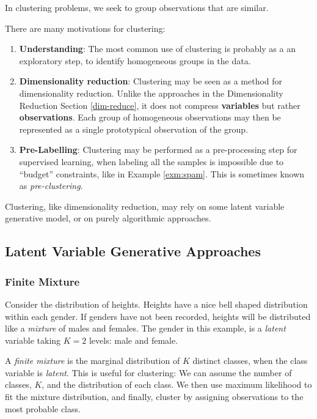 \documentclass[]{book}
\providecommand{\tightlist}{%
  \setlength{\itemsep}{0pt}\setlength{\parskip}{0pt}}
\theoremstyle{definition}
\theoremstyle{definition}
\theoremstyle{definition}
\theoremstyle{remark}
\let\BeginKnitrBlock\begin \let\EndKnitrBlock\end
\begin{document}
In clustering problems, we seek to group observations that are similar.

There are many motivations for clustering:

\begin{enumerate}
\def\labelenumi{\arabic{enumi}.}
\tightlist
\item
  \textbf{Understanding}: The most common use of clustering is probably
  as a an exploratory step, to identify homogeneous groups in the data.
\item
  \textbf{Dimensionality reduction}: Clustering may be seen as a method
  for dimensionality reduction. Unlike the approaches in the
  Dimensionality Reduction Section \ref{dim-reduce}, it does not
  compress \textbf{variables} but rather \textbf{observations}. Each
  group of homogeneous observations may then be represented as a single
  prototypical observation of the group.
\item
  \textbf{Pre-Labelling}: Clustering may be performed as a
  pre-processing step for supervised learning, when labeling all the
  samples is impossible due to ``budget'' constraints, like in Example
  \ref{exm:spam}. This is sometimes known as \emph{pre-clustering}.
\end{enumerate}

Clustering, like dimensionality reduction, may rely on some latent
variable generative model, or on purely algorithmic approaches.

\subsection{Latent Variable Generative
Approaches}\label{latent-variable-generative-approaches-1}

\subsubsection{Finite Mixture}\label{finite-mixture}

\BeginKnitrBlock{example}
\protect\hypertarget{exm:males-females}{}{\label{exm:males-females}
}Consider the distribution of heights. Heights have a nice bell shaped
distribution within each gender. If genders have not been recorded,
heights will be distributed like a \emph{mixture} of males and females.
The gender in this example, is a \emph{latent} variable taking \(K=2\)
levels: male and female.
\EndKnitrBlock{example}

A \emph{finite mixture} is the marginal distribution of \(K\) distinct
classes, when the class variable is \emph{latent}. This is useful for
clustering: We can assume the number of classes, \(K\), and the
distribution of each class. We then use maximum likelihood to fit the
mixture distribution, and finally, cluster by assigning observations to
the most probable class.
\end{document}
